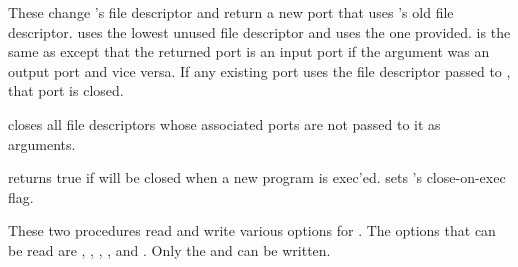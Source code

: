 \begin{protos}
\end{protos}
\noindent
These change 's file descriptor and return a new port
 that uses 's old file descriptor.
 uses the lowest unused file descriptor and  uses the
 one provided.
 is the same as  except that the returned
 port is an input port if the argument was an output port and vice
 versa.
If any existing port uses the file descriptor passed to , that
 port is closed.

\begin{protos}
\end{protos}
\noindent
{} closes all file descriptors whose associated ports
 are not passed to it as arguments.

%
%
%


%

\begin{protos}
\end{protos}
\noindent
{} returns true if  will be closed
 when a new program is exec'ed.
 sets 's close-on-exec flag.


\begin{protos}
\end{protos}
\noindent
These two procedures read and write various options for .
The options that can be read are , ,
 , , and .
Only the  and  can be written.

